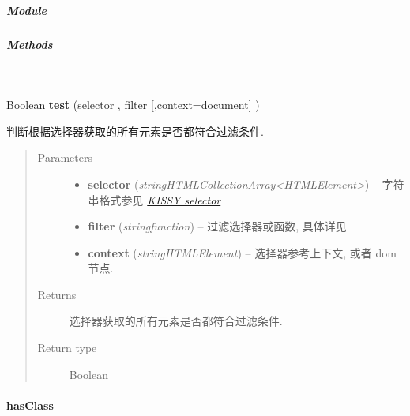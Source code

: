 \documentclass[letterpaper,10pt,english]{sphinxmanual}
\begin{document}
\subparagraph{Module}
\label{api/core/dom/test:module}\begin{quote}

{\hyperref[api/core/dom/index:module-DOM]{}}
\end{quote}


\subparagraph{Methods}
\label{api/core/dom/test:methods}

\begin{fulllineitems}
\label{api/core/dom/test:DOM.test}~
\begin{DUlineblock}{0em}
\item[] Boolean \textbf{test} (selector , filter {[},context=document{]} )
\item[] 判断根据选择器获取的所有元素是否都符合过滤条件.
\end{DUlineblock}
\begin{quote}\begin{description}
\item[{Parameters}] \leavevmode\begin{itemize}
\item {}
\textbf{selector} (\emph{string\textbar{}HTMLCollection\textbar{}Array\textless{}HTMLElement\textgreater{}}) -- 字符串格式参见 {\hyperref[api/core/dom/selector:dom-selector]{\emph{KISSY selector}}}

\item {}
\textbf{filter} (\emph{string\textbar{}function}) -- 过滤选择器或函数, 具体详见 {\hyperref[api/core/dom/filter:DOM.filter]{}}

\item {}
\textbf{context} (\emph{string\textbar{}HTMLElement}) -- 选择器参考上下文,  或者 dom 节点.

\end{itemize}

\item[{Returns}] \leavevmode
选择器获取的所有元素是否都符合过滤条件.

\item[{Return type}] \leavevmode
Boolean

\end{description}\end{quote}

\end{fulllineitems}



\paragraph{hasClass}
\label{api/core/dom/hasClass:hasclass}\label{api/core/dom/hasClass::doc}
\end{document}

